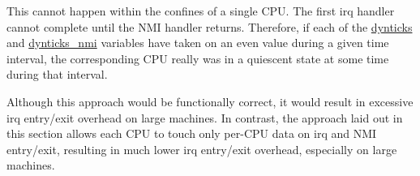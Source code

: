 	This cannot happen within the confines of a single CPU.
	The first irq handler cannot complete until the NMI handler
	returns.
	Therefore, if each of the \url{dynticks} and \url{dynticks_nmi}
	variables have taken on an even value during a given time
	interval, the corresponding CPU really was in a quiescent
	state at some time during that interval.


	Although this approach would be functionally correct, it
	would result in excessive irq entry/exit overhead on
	large machines.
	In contrast, the approach laid out in this section allows
	each CPU to touch only per-CPU data on irq and NMI entry/exit,
	resulting in much lower irq entry/exit overhead, especially
	on large machines.

